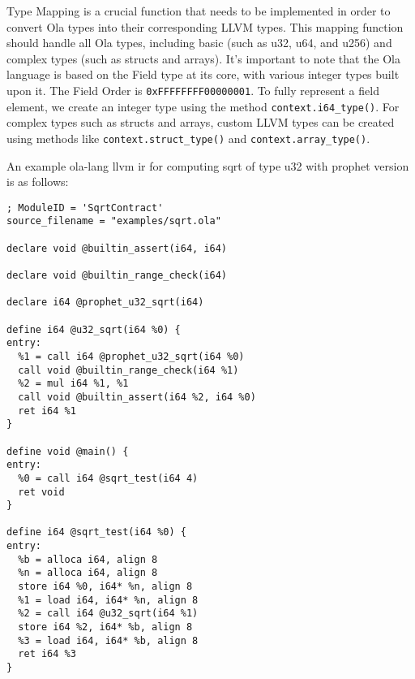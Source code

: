 Type Mapping is a crucial function that needs to be implemented in order to convert Ola types into their corresponding LLVM types. This mapping function should handle all Ola types, including basic (such as u32, u64, and u256) and complex types (such as structs and arrays). It's important to note that the Ola language is based on the Field type at its core, with various integer types built upon it. The Field Order is \texttt{0xFFFFFFFF00000001}. To fully represent a field element, we create an integer type using the method \texttt{context.i64\_type()}. For complex types such as structs and arrays, custom LLVM types can be created using methods like \texttt{context.struct\_type()} and \texttt{context.array\_type()}.

An example ola-lang llvm ir for computing sqrt of type u32 with prophet version is as follows:
\begin{lstlisting}
; ModuleID = 'SqrtContract'
source_filename = "examples/sqrt.ola"

declare void @builtin_assert(i64, i64)

declare void @builtin_range_check(i64)

declare i64 @prophet_u32_sqrt(i64)

define i64 @u32_sqrt(i64 %0) {
entry:
  %1 = call i64 @prophet_u32_sqrt(i64 %0)
  call void @builtin_range_check(i64 %1)
  %2 = mul i64 %1, %1
  call void @builtin_assert(i64 %2, i64 %0)
  ret i64 %1
}

define void @main() {
entry:
  %0 = call i64 @sqrt_test(i64 4)
  ret void
}

define i64 @sqrt_test(i64 %0) {
entry:
  %b = alloca i64, align 8
  %n = alloca i64, align 8
  store i64 %0, i64* %n, align 8
  %1 = load i64, i64* %n, align 8
  %2 = call i64 @u32_sqrt(i64 %1)
  store i64 %2, i64* %b, align 8
  %3 = load i64, i64* %b, align 8
  ret i64 %3
}
\end{lstlisting}

